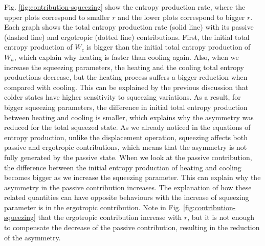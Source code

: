 Fig. \ref{fig:contribution-squeezing} show the entropy production rate, where the upper plots correspond to smaller $r$ and the lower plots correspond to bigger $r$. Each graph shows the total entropy production rate (solid line) with its passive (dashed line) and ergotropic (dotted line) contributions. First, the initial total entropy production of $W_c$ is bigger than the initial total entropy production of $W_h$, which explain why heating is faster than cooling again. Also, when we increase the squeezing parameters, the heating and the cooling total entropy productions decrease, but the heating process suffers a bigger reduction when compared with cooling. This can be explained by the previous discussion that colder states have higher sensitivity to squeezing variations. As a result, for bigger squeezing parameters, the difference in initial total entropy production between heating and cooling is smaller, which explains why the asymmetry was reduced for the total squeezed state. As we already noticed in the equations of entropy production, unlike the displacement operation, squeezing affects both passive and ergotropic contributions, which means that the asymmetry is not fully generated by the passive state. When we look at the passive contribution, the difference between the initial entropy production of heating and cooling becomes bigger as we increase the squeezing parameter. This can explain why the asymmetry in the passive contribution increases. The explanation of how these related quantities can have opposite behaviours with the increase of squeezing parameter is in the ergotropic contribution. Note in Fig. \ref{fig:contribution-squeezing} that the ergotropic contribution increase with $r$, but it is not enough to compensate the decrease of the passive contribution, resulting in the reduction of the asymmetry.

